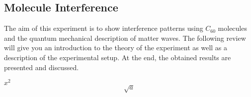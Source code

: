 \documentclass[12pt,a4paper]{article}
\begin{document}

\pagebreak

\setlength{\columnsep}{20pt}
\begin{multicols}{2}

\begin{abstract}

\end{abstract}


%

\section{Molecule Interference}
The aim of this experiment is to show interference patterns using $C_{60}$ molecules and the quantum mechanical description of matter waves. The following review will give you an introduction to the theory of the experiment as well as a description of the experimental setup. At the end, the obtained results are presented and discussed.

$x^2$\\

$$\sqrt{a}$$


\end{multicols}
\end{document}
